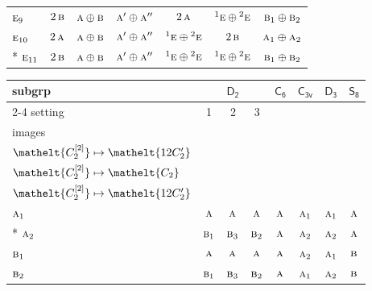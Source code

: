 \documentclass[10pt,a4paper]{article}
\numberwithin{equation}{section}
\newcommand{\eltfont}[1]{{\let\sigma\eltsigma\mathelt{#1}}}
\newcommand{\grp}[1]{\mathsf{#1}}
\newcommand{\irr}[1]{\text{\normalfont\scshape #1}}
\newcommand{\conjpair}[1]{{}^{#1}}
\newcommand{\cls}[1]{\eltfont{#1}}
\newcommand{\genidx}[2]{#1^{[\mathrm{#2}]}}
\begin{document}
{\begin{longtable}{@{}lcccccc@{}}
$\irr{e}_{9}$ & $2\,\irr{b}$ & $\irr{a}\oplus \irr{b}$ & $\irr{a}'\oplus \irr{a}''$ & $2\,\irr{a}$ & $\conjpair{1}\irr{e}\oplus \conjpair{2}\irr{e}$ & $\irr{b}_{1}\oplus \irr{b}_{2}$\\
$\irr{e}_{10}$ & $2\,\irr{a}$ & $\irr{a}\oplus \irr{b}$ & $\irr{a}'\oplus \irr{a}''$ & $\conjpair{1}\irr{e}\oplus \conjpair{2}\irr{e}$ & $2\,\irr{b}$ & $\irr{a}_{1}\oplus \irr{a}_{2}$\\*
$\irr{e}_{11}$ & $2\,\irr{b}$ & $\irr{a}\oplus \irr{b}$ & $\irr{a}'\oplus \irr{a}''$ & $\conjpair{1}\irr{e}\oplus \conjpair{2}\irr{e}$ & $\conjpair{1}\irr{e}\oplus \conjpair{2}\irr{e}$ & $\irr{b}_{1}\oplus \irr{b}_{2}$\\
\bottomrule\end{longtable}}
{\small\begin{longtable}{@{}lccccccc@{}}\toprule
subgrp & \multicolumn{3}{c}{\href{D2.pdf}{$\grp{D_{2}}$}} & \href{C6.pdf}{$\grp{C_{6}}$} & \href{C3v.pdf}{$\grp{C_{3v}}$} & \href{D3.pdf}{$\grp{D_{3}}$} & \href{S8.pdf}{$\grp{S_{8}}$}\\\cmidrule(lr){2-4}
setting & 1 & 2 & 3 &  &  &  & \\
images & {\scriptsize\begin{tabular}[t]{@{}c@{}}$\cls{\genidx{C_{2}}{1}} \mapsto \cls{C_{2}}$\\$\cls{\genidx{C_{2}}{2}} \mapsto \cls{12C_{2}'}$\end{tabular}} & {\scriptsize\begin{tabular}[t]{@{}c@{}}$\cls{\genidx{C_{2}}{1}} \mapsto \cls{12C_{2}'}$\\$\cls{\genidx{C_{2}}{2}} \mapsto \cls{C_{2}}$\end{tabular}} & {\scriptsize\begin{tabular}[t]{@{}c@{}}$\cls{\genidx{C_{2}}{1}} \mapsto \cls{12C_{2}'}$\\$\cls{\genidx{C_{2}}{2}} \mapsto \cls{12C_{2}'}$\end{tabular}} &  &  &  & \\\midrule\endhead
\bottomrule\endfoot\endlastfoot
$\irr{a}_{1}$ & $\irr{a}$ & $\irr{a}$ & $\irr{a}$ & $\irr{a}$ & $\irr{a}_{1}$ & $\irr{a}_{1}$ & $\irr{a}$\\*
$\irr{a}_{2}$ & $\irr{b}_{1}$ & $\irr{b}_{3}$ & $\irr{b}_{2}$ & $\irr{a}$ & $\irr{a}_{2}$ & $\irr{a}_{2}$ & $\irr{a}$\\
$\irr{b}_{1}$ & $\irr{a}$ & $\irr{a}$ & $\irr{a}$ & $\irr{a}$ & $\irr{a}_{2}$ & $\irr{a}_{1}$ & $\irr{b}$\\
$\irr{b}_{2}$ & $\irr{b}_{1}$ & $\irr{b}_{3}$ & $\irr{b}_{2}$ & $\irr{a}$ & $\irr{a}_{1}$ & $\irr{a}_{2}$ & $\irr{b}$\\

\end{longtable}}
\end{document}
